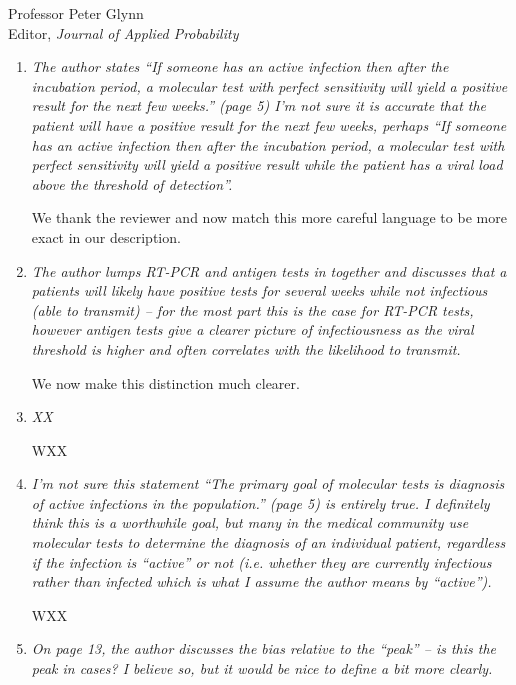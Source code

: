 \documentclass[11pt]{letter} %
\begin{document}
\begin{letter}{Professor
	Peter Glynn\\
	Editor, {\em Journal of Applied Probability}}
\begin{enumerate}
We use Figure XX to make precise the importance of viral threshold.
\vspace{5mm}
\item {\it The author states “If someone has an active infection then after the incubation period, a molecular test with perfect sensitivity will yield a positive result for the next few weeks.” (page 5) I’m not sure it is accurate that the patient will have a positive result for the next few weeks, perhaps “If someone has an active infection then after the incubation period, a molecular test with perfect sensitivity will yield a positive result while the patient has a viral load above the threshold of detection”.}
\vspace{5mm}

We thank the reviewer and now match this more careful language to be more exact in our description.
\vspace{5mm}
\item {\it The author lumps RT-PCR and antigen tests in together and discusses that a patients will likely have positive tests for several weeks while not infectious (able to transmit) – for the most part this is the case for RT-PCR tests, however antigen tests give a clearer picture of infectiousness as the viral threshold is higher and often correlates with the likelihood to transmit.}

\vspace{5mm}
We now make this distinction much clearer.
\vspace{5mm}
\item {\it XX}

\vspace{5mm}
WXX
\vspace{5mm}
\item {\it I’m not sure this statement “The primary goal of molecular tests is diagnosis of active infections in the population.” (page 5) is entirely true. I definitely think this is a worthwhile goal, but many in the medical community use molecular tests to determine the diagnosis of an individual patient, regardless if the infection is “active” or not (i.e. whether they are currently infectious rather than infected which is what I assume the author means by “active”).}

\vspace{5mm}
WXX
\vspace{5mm}
\item {\it On page 13, the author discusses the bias relative to the “peak” – is this the peak in cases? I believe so, but it would be nice to define a bit more clearly.}


\end{enumerate}
\end{letter}
\end{document}
